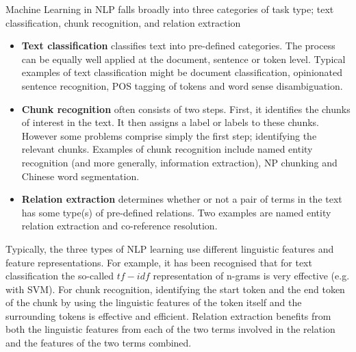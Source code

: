 
Machine Learning in NLP falls broadly into three categories of task type; text
classification, chunk recognition, and relation extraction

\begin{itemize}
  
\item {\bf Text classification}
classifies text into pre-defined categories. The process can be
equally well applied at the document, sentence or token level. Typical
examples of text classification might be document classification,
opinionated sentence recognition, POS tagging of tokens and word sense
disambiguation.

\item {\bf Chunk recognition} often consists of two steps. First, it identifies
the chunks of interest in the text. It then assigns a label or labels to these
chunks. However some problems comprise simply the first step; identifying the
relevant chunks. Examples of chunk recognition include named entity recognition
(and more generally, information extraction), NP chunking and Chinese word
segmentation.

\item {\bf Relation extraction} determines whether or not a pair of terms in the
text has some type(s) of pre-defined relations. Two examples are named entity
relation extraction and co-reference resolution.

\end{itemize}

Typically, the three types of NLP learning use different linguistic features and
feature representations. For example, it has been recognised that for text
classification the so-called $tf-idf$ representation of n-grams is very effective
(e.g. with SVM).  For chunk recognition, identifying the start token and the end
token of the chunk by using the linguistic features of the token itself and the
surrounding tokens is effective and efficient. Relation extraction benefits from
both the linguistic features from each of the two terms involved in the relation
and the features of the two terms combined.


